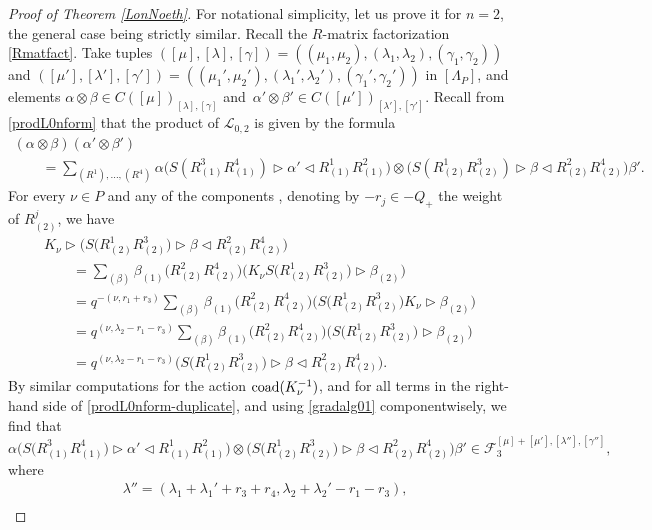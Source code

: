 \documentclass[10pt,a4paper]{amsart}
\numberwithin{equation}{section}
\theoremstyle{definition}
\newcommand{\Ff}{{\mathcal F}}
\newcommand{\Ll}{{\mathcal L}}
\begin{document}
\begin{proof}[Proof of Theorem \ref{LonNoeth}]
For notational simplicity, let us prove it for $n=2$, the general case being strictly similar. Recall the $R$-matrix factorization \eqref{Rmatfact}. Take tuples $([\mu],[\lambda],[\gamma]) =((\mu_1,\mu_2),(\lambda_1,\lambda_2),(\gamma_1,\gamma_2))$ and $([\mu'],[\lambda'],[\gamma'])=((\mu_1',\mu_2'),(\lambda_1',\lambda_2'),(\gamma_1',\gamma_2'))$ in $[\Lambda_P]$, and elements $\alpha\otimes \beta \in C([\mu])_{[\lambda],[\gamma]}$ and~${\alpha'\otimes \beta'\in C([\mu'])_{[\lambda'],[\gamma']}}$. Recall from \eqref{prodL0nform} that the product of $\Ll_{0,2}$ is given by the formula
\begin{gather}
(\alpha\otimes \beta) (\alpha' \otimes \beta') \nonumber\\
\qquad= \sum_{(R^1),\dots, (R^4)} \alpha \bigl(S(R^3_{(1)}R^4_{(1)})\rhd \alpha' \lhd R^1_{(1)}R^2_{(1)}\bigr)\otimes \bigl( S(R^1_{(2)}R^3_{(2)}) \rhd \beta \lhd R^2_{(2)}R^4_{(2)}\bigr)\beta'.\label{prodL0nform-duplicate}
\end{gather}
For every $\nu\in P$ and any of the components , denoting by $-r_j\in -Q_+$ the weight of $R^j_{(2)}$, we have
\begin{gather*}
K_\nu \rhd \big( S\big(R^1_{(2)}R^3_{(2)}\big) \rhd \beta \lhd R^2_{(2)}R^4_{(2)}\big) \\
 \qquad= \sum_{(\beta)} \beta_{(1)}\big(R^2_{(2)}R^4_{(2)}\big)\big(K_\nu S\big(R^1_{(2)}R^3_{(2)}\big)\rhd \beta_{(2)}\big)\\
 \qquad= q^{-(\nu,r_1+r_3)}\sum_{(\beta)} \beta_{(1)}\big(R^2_{(2)}R^4_{(2)}\big)\big(S\big(R^1_{(2)}R^3_{(2)}\big)K_\nu \rhd \beta_{(2)}\big)\\
 \qquad= q^{(\nu,\lambda_2-r_1-r_3)}\sum_{(\beta)} \beta_{(1)}\bigl(R^2_{(2)}R^4_{(2)}\bigr)\big(S\big(R^1_{(2)}R^3_{(2)}\big)\rhd \beta_{(2)}\big)\\
 \qquad= q^{(\nu,\lambda_2-r_1-r_3)} \big( S\big(R^1_{(2)}R^3_{(2)}\big) \rhd \beta \lhd R^2_{(2)}R^4_{(2)}\big).
\end{gather*}
By similar computations for the action ${\rm coad}(K_\nu^{-1})$, and for all terms in the right-hand side of \eqref{prodL0nform-duplicate}, and using \eqref{gradalg01} componentwisely, we find that
\[\alpha \big(S\big(R^3_{(1)}R^4_{(1)}\big)\rhd \alpha' \lhd R^1_{(1)}R^2_{(1)}\big)\otimes \big( S\big(R^1_{(2)}R^3_{(2)}\big) \rhd \beta \lhd R^2_{(2)}R^4_{(2)}\big)\beta' \in \Ff_3^{[\mu]+[\mu'], [\lambda''],[\gamma'']},\]
where
\begin{align*}
&\lambda'' = (\lambda_1+\lambda_1'+r_3+r_4,\lambda_2+\lambda_2'-r_1-r_3),\\

\end{align*}
\end{proof}
\end{document}
